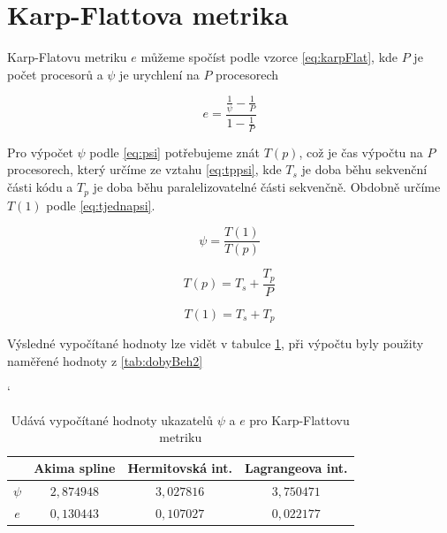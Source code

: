 \documentclass{article}
\begin{document}
	
	\section{Karp-Flattova metrika}
	Karp-Flatovu metriku $e$ můžeme spočíst podle vzorce \ref{eq:karpFlat}, kde $P$ je počet procesorů a $\psi$ je urychlení na $P$ procesorech
	
	\begin{equation} 
	e={\frac  {{\frac  {1}{\psi }}-{\frac  {1}{P}}}{1-{\frac  {1}{P}}}}
	\label{eq:karpFlat}
	\end{equation}
	
	Pro výpočet $\psi$ podle \ref{eq:psi} potřebujeme znát $T(p)$, což je čas výpočtu na $P$ procesorech, který určíme ze vztahu  \ref{eq:tppsi}, kde $T_{s}$ je doba běhu sekvenční části kódu a  $T_{p}$ je doba běhu paralelizovatelné části sekvenčně. Obdobně určíme $T(1)$ podle \ref{eq:tjednapsi}.
	
	
	\begin{equation} 
	\psi = \frac{T(1)}{T(p)}
	\label{eq:psi}
	\end{equation}
	
	\begin{equation} 
	T(p) = T_{s} + \frac{T_{p}}{P}
	\label{eq:tppsi}
	\end{equation}
	
	\begin{equation} 
	T(1) = T_{s} + T_{p}
	\label{eq:tjednapsi}
	\end{equation}
	
	Výsledné vypočítané hodnoty lze vidět v tabulce \ref{tab:karpik}, při výpočtu byly použity naměřené hodnoty z \ref{tab:dobyBeh2}
	
	\begin{table}[h]
	\centering
	\catcode`
	\def\arraystretch{1.2}
	\begin{tabular}{|c|c|c|c|}
	\hline
	\textbf{}   & \textbf{Akima spline} & \textbf{Hermitovská int.} &  \textbf{Lagrangeova int.} \\ \hline
	\hline
	$\psi$    		  & $2,874948$                  &  $3,027816 $     		  &       $ 3,750471$                     \\ \hline
	$e$                  &  $0,130443$                  &   $0,107027$               &      $0,022177$                         \\ \hline
	\end{tabular}
	\caption{Udává vypočítané hodnoty ukazatelů $\psi$ a $e$ pro Karp-Flattovu metriku}
	\label{tab:karpik}
	\end{table}
	
\end{document}
